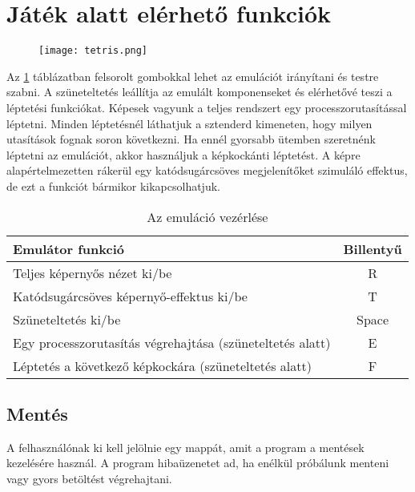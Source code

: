 \section{Játék alatt elérhető funkciók}

\begin{figure}[H]
	\centering
	\texttt{[image: tetris.png]}
\end{figure}

Az \ref{fig:emucontrol} táblázatban felsorolt gombokkal lehet az emulációt irányítani és testre szabni. A szüneteltetés leállítja az emulált komponenseket és elérhetővé teszi a léptetési funkciókat. Képesek vagyunk a teljes rendszert egy processzorutasítással léptetni. Minden léptetésnél láthatjuk a sztenderd kimeneten, hogy milyen utasítások fognak soron következni. Ha ennél gyorsabb ütemben szeretnénk léptetni az emulációt, akkor használjuk a képkockánti léptetést. A képre alapértelmezetten rákerül egy katódsugárcsöves megjelenítőket szimuláló effektus, de ezt a funkciót bármikor kikapcsolhatjuk.

\begin{table}[H]
	\centering
	\begin{tabular}{ | l | c | }
		\hline
		Emulátor funkció & Billentyű \\
		\hline			
		Teljes képernyős nézet ki/be & R \\
		Katódsugárcsöves képernyő-effektus ki/be & T \\
		Szüneteltetés ki/be & Space \\
		Egy processzorutasítás végrehajtása (szüneteltetés alatt) & E \\
		Léptetés a következő képkockára (szüneteltetés alatt) & F \\
		\hline
	\end{tabular}
	\caption{Az emuláció vezérlése}
	\label{fig:emucontrol}
\end{table}

\subsection{Mentés}

A felhasználónak ki kell jelölnie egy mappát, amit a program a mentések kezelésére használ. A program hibaüzenetet ad, ha enélkül próbálunk menteni vagy gyors betöltést végrehajtani.

